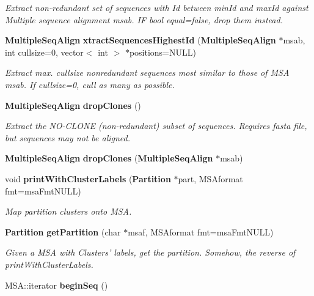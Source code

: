 \begin{CompactItemize}
\begin{CompactList}\small\item\em Extract non-redundant set of sequences with Id between min\-Id and max\-Id against Multiple sequence alignment msab. IF bool equal=false, drop them instead. \item\end{CompactList}\item 
{\bf Multiple\-Seq\-Align} {\bf xtract\-Sequences\-Highest\-Id} ({\bf Multiple\-Seq\-Align} $\ast$msab, int cullsize=0, vector$<$ int $>$ $\ast$positions=NULL)\label{classMultipleSeqAlign_a6}

\begin{CompactList}\small\item\em Extract max. cullsize nonredundant sequences most similar to those of MSA msab. If cullsize=0, cull as many as possible. \item\end{CompactList}\item 
{\bf Multiple\-Seq\-Align} {\bf drop\-Clones} ()\label{classMultipleSeqAlign_a7}

\begin{CompactList}\small\item\em Extract the NO-CLONE (non-redundant) subset of sequences. Requires fasta file, but sequences may not be aligned. \item\end{CompactList}\item 
{\bf Multiple\-Seq\-Align} {\bf drop\-Clones} ({\bf Multiple\-Seq\-Align} $\ast$msab)\label{classMultipleSeqAlign_a8}

\item 
void {\bf print\-With\-Cluster\-Labels} ({\bf Partition} $\ast$part, MSAformat fmt=msa\-Fmt\-NULL)\label{classMultipleSeqAlign_a9}

\begin{CompactList}\small\item\em Map partition clusters onto MSA. \item\end{CompactList}\item 
{\bf Partition} {\bf get\-Partition} (char $\ast$msaf, MSAformat fmt=msa\-Fmt\-NULL)\label{classMultipleSeqAlign_a10}

\begin{CompactList}\small\item\em Given a MSA with Clusters' labels, get the partition. Somehow, the reverse of print\-With\-Cluster\-Labels. \item\end{CompactList}\item 
MSA::iterator {\bf begin\-Seq} ()\label{classMultipleSeqAlign_a11}


\end{CompactItemize}
